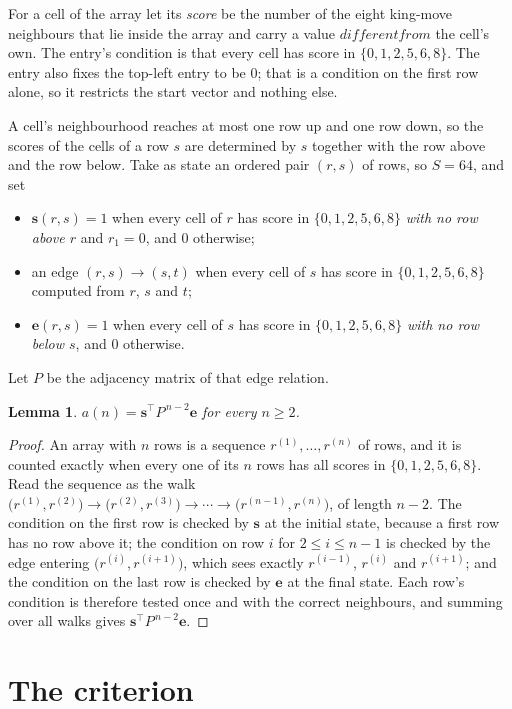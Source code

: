 \documentclass[11pt,a4paper]{article}
\theoremstyle{plain}
\newtheorem{lemma}[theorem]{Lemma}
\theoremstyle{definition}
\begin{document}
For a cell of the array let its \emph{score} be the number of the eight king-move neighbours that lie inside
the array and carry a value $different from$ the cell's own. The entry's condition is that every cell
has score in $\{0,1,2,5,6,8\}$. The entry also fixes the top-left entry to be $0$; that is a condition on the first row alone, so it restricts the start vector and nothing else.

A cell's neighbourhood reaches at most one row up and one row down, so the scores of the
cells of a row $s$ are determined by $s$ together with the row above and the row below.
Take as state an ordered pair $(r,s)$ of rows, so $S=64$, and set
\begin{itemize}
\item $\mathbf{s}(r,s)=1$ when every cell of $r$ has score in $\{0,1,2,5,6,8\}$ \emph{with no row
above $r$} and $r_1=0$, and $0$ otherwise;
\item an edge $(r,s)\to(s,t)$ when every cell of $s$ has score in $\{0,1,2,5,6,8\}$ computed from
$r$, $s$ and $t$;
\item $\mathbf{e}(r,s)=1$ when every cell of $s$ has score in $\{0,1,2,5,6,8\}$ \emph{with no row
below $s$}, and $0$ otherwise.
\end{itemize}
Let $P$ be the adjacency matrix of that edge relation.

\begin{lemma}\label{lem:walk}
$a(n)=\mathbf{s}^{\!\top}P^{\,n-2}\mathbf{e}$ for every $n\ge2$.
\end{lemma}

\begin{proof}
An array with $n$ rows is a sequence $r^{(1)},\dots,r^{(n)}$ of rows, and it is counted
exactly when every one of its $n$ rows has all scores in $\{0,1,2,5,6,8\}$. Read the sequence as the
walk $\bigl(r^{(1)},r^{(2)}\bigr)\to\bigl(r^{(2)},r^{(3)}\bigr)\to\cdots\to
\bigl(r^{(n-1)},r^{(n)}\bigr)$, of length $n-2$. The condition on the first row is
checked by $\mathbf{s}$ at the initial state, because a first row has no row above it; the
condition on row $i$ for $2\le i\le n-1$ is checked by the edge entering
$\bigl(r^{(i)},r^{(i+1)}\bigr)$, which sees exactly $r^{(i-1)}$, $r^{(i)}$ and
$r^{(i+1)}$; and the condition on the last row is checked by $\mathbf{e}$ at the final
state. Each row's condition is therefore tested once and with the correct neighbours, and
summing over all walks gives $\mathbf{s}^{\!\top}P^{\,n-2}\mathbf{e}$.
\end{proof}

\section{The criterion}
\end{document}
